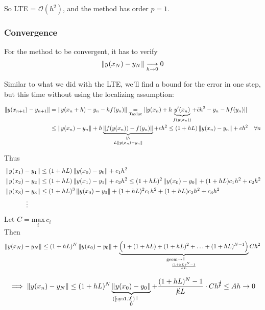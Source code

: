 So LTE = $\mathcal{O}(h^2)$, and the method has order $p=1$.

\subsubsection{Convergence}

For the method to be convergent, it has to verify $$\left\lVert y(x_N) - y_N\right\rVert \underset{h\to0}{\longrightarrow} 0$$

Similar to what we did with the LTE, we'll find a bound for the error in one step, but this time without using the localizing assumption:

\begin{align*}
    \norm{y(x_{n+1}) - y_{n+1}} &= \norm{y(x_n + h) - y_n - hf(y_n)} \underset{\text{Taylor}}{=} ||y(x_n) + h\underbrace{y'(x_n)}_{f(y(x_n))} + \Tilde{c}h^2 - y_n - hf(y_n)|| \\
    &\leq \norm{y(x_n) - y_n} + h\underbrace{\norm{f(y(x_n)) - f(y_n)}}_{\substack{\text{\rotatebox{270}{$\leq$}} \\ L\norm{y(x_n) - y_n}}} + ch^2 \leq (1+hL)\norm{y(x_n) - y_n} + ch^2 \quad \forall n
\end{align*}

Thus
\begin{align*}
    &\left\lVert y(x_1) - y_1\right\rVert \leq (1+hL)\left\lVert y(x_0) - y_0\right\rVert + c_1h^2 \\
    &\left\lVert y(x_2) - y_2\right\rVert \leq (1+hL)\left\lVert y(x_1) - y_1\right\rVert + c_2h^2 \leq (1+hL)^2\left\lVert y(x_0) - y_0\right\rVert + (1+hL)c_1h^2 + c_2h^2 \\
    &\left\lVert y(x_3) - y_3\right\rVert \leq (1+hL)^3\left\lVert y(x_0) - y_0\right\rVert + (1+hL)^2c_1h^2 + (1+hL)c_2h^2 + c_3h^2\\
    &\hspace{1.2cm}\vdots
\end{align*}
Let $C = \underset{i}{\text{max}}\,c_i$ \\

Then
\begin{align*}
    \norm{y(x_N) - y_N} \leq (1+hL)^N \norm{y(x_0) - y_0} + \underbrace{\Big(1 + (1+hL) + (1+hL)^2 + \ldots + (1+hL)^{N-1}\Big)}_{\substack{\text{\hspace{-0.94cm}geom$\to\,$\rotatebox{90}{$=$}}\\\frac{(1+hL)^N-1}{hL}}}Ch^2
\end{align*}

\[
  \implies \norm{y(x_n) - y_N} \leq (1+hL)^N\underbrace{\norm{y(x_0) - y_0}}_{\substack{\text{\hspace{-0.6cm}(\ref{sys1.2})\,\rotatebox{90}{=}}\\ 0}} + \frac{(1+hL)^N-1}{\cancel{h}L}\cdot Ch^{\cancel{2}} \leq Ah \to 0
\]

